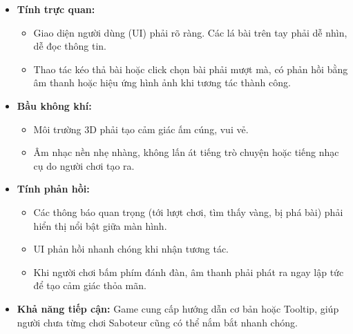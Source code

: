 \begin{itemize}
    \item \textbf{Tính trực quan:}
        \begin{itemize}
            \item Giao diện người dùng (UI) phải rõ ràng. Các lá bài trên tay phải dễ nhìn, dễ đọc thông tin.
            \item Thao tác kéo thả bài hoặc click chọn bài phải mượt mà, có phản hồi bằng âm thanh hoặc hiệu ứng hình ảnh khi tương tác thành công.
        \end{itemize}
    \item \textbf{Bầu không khí:}
        \begin{itemize}
            \item Môi trường 3D phải tạo cảm giác ấm cúng, vui vẻ.
            \item Âm nhạc nền nhẹ nhàng, không lấn át tiếng trò chuyện hoặc tiếng nhạc cụ do người chơi tạo ra.
        \end{itemize}
    \item \textbf{Tính phản hồi:}
        \begin{itemize}
            \item Các thông báo quan trọng (tới lượt chơi, tìm thấy vàng, bị phá bài) phải hiển thị nổi bật giữa màn hình.
            \item UI phản hồi nhanh chóng khi nhận tương tác.
            \item Khi người chơi bấm phím đánh đàn, âm thanh phải phát ra ngay lập tức để tạo cảm giác thỏa mãn.
        \end{itemize}
    \item \textbf{Khả năng tiếp cận:} Game cung cấp hướng dẫn cơ bản hoặc Tooltip, giúp người chưa từng chơi Saboteur cũng có thể nắm bắt nhanh chóng.
\end{itemize}

\newpage